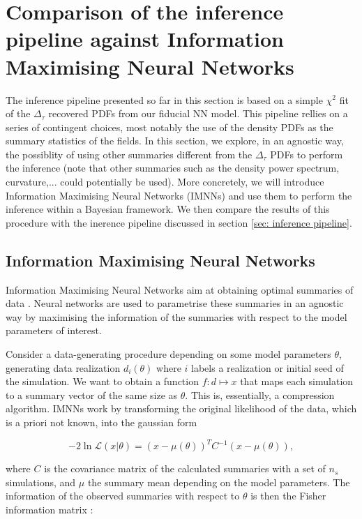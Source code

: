 \section{Comparison of the inference pipeline against Information Maximising Neural Networks}


The inference pipeline presented so far in this section is based on a simple $\chi^2$ fit of the $\Delta_\tau$ recovered PDFs from our fiducial NN model. This pipeline rellies on a series of contingent choices, most notably the use of the density PDFs as the summary statistics of the fields. In this section, we explore, in an agnostic way, the possiblity of using other summaries different from the $\Delta_\tau$ PDFs to perform the inference (note that other summaries such as the density power spectrum, curvature,... could potentially be used). More concretely, we will introduce Information Maximising Neural Networks (IMNNs) and use them to perform the inference within a Bayesian framework. We then compare the results of this procedure with the inerence pipeline discussed in section \ref{sec: inference pipeline}.

\subsection{Information Maximising Neural Networks}
Information Maximising Neural Networks aim at obtaining optimal summaries of data \cite{Charnock_2018}. Neural networks are used to parametrise these summaries in an agnostic way by maximising the information of the summaries with respect to the model parameters of interest.

Consider a data-generating procedure depending on some model parameters $\theta$, generating data realization $d_i(\theta)$ where $i$ labels a realization or initial seed of the simulation. We want to obtain a function $f \colon d \mapsto x$ that maps each simulation to a summary vector of the same size as $\theta$. This is, essentially, a compression algorithm. IMNNs work by transforming the original likelihood of the data, which is a priori not known, into the gaussian form

\begin{equation}
    -2\ln\mathcal{L}\left(x|\theta\right)=\left(x-\mu\left(\theta\right)\right)^TC^{-1}\left(x-\mu\left(\theta\right)\right),
\end{equation}

where $C$ is the covariance matrix of the calculated summaries with a set of $n_s$ simulations, and $\mu$ the summary mean depending on the model parameters. The information of the observed summaries with respect to $\theta$ is then the Fisher information matrix \cite{ly2017tutorialfisherinformation}:


